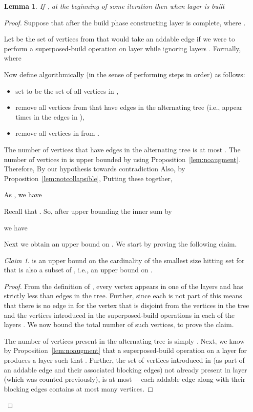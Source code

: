 \documentclass[11pt]{article}
\newtheorem{lemma}[theorem]{Lemma}
\theoremstyle{definition}
\theoremstyle{remark}
\newtheorem{claim}[theorem]{Claim}
\begin{document}
\begin{lemma}\label{lem:addable1}
  If , at the beginning of some iteration then when layer  is built

\end{lemma}
\begin{proof}
  Suppose that after the build phase constructing layer  is complete,  where . 

  Let  be the set of  vertices from  that would
  take an addable edge if we were to perform a superposed-build
  operation on layer  while ignoring layers
  . Formally,  where
  

  Now define  algorithmically (in the sense of performing steps in
  order) as follows:
  \begin{itemize}
  \item set  to be the set of all  vertices in ,
  \item remove all  vertices from  that have  edges in the alternating tree (i.e., appear  times in the edges in ),
  \item remove all  vertices in  from .
  \end{itemize}
The number of  vertices that have  edges in the alternating tree is at most . The number of  vertices in  is upper bounded by  using Proposition~\ref{lem:noaugment}. Therefore, 
By our hypothesis towards contradiction  Also, by Proposition~\ref{lem:notcollapsible},  Putting these together,


As , we have 

Recall that . So, after upper bounding the inner sum by

we have 

Next we obtain an upper bound on . We start by proving the following claim.

\begin{claim}\label{claim:local}
   is an upper bound on the cardinality of the
  smallest size hitting set for  that is also a subset of , i.e., an upper bound on .
\end{claim}
\begin{proof}
  From the definition of , every vertex  appears in one of
  the layers  and has strictly less than  edges
  in the tree. Further, since each  is not part of
   this means that there is no edge in  for
  the vertex  that is disjoint from the  vertices in the tree
  and the  vertices introduced in the superposed-build operations
  in each of the layers . We now bound the total
  number of such  vertices, to prove the claim.

The number of  vertices present in the alternating tree
 is simply . Next, we know by Proposition~\ref{lem:noaugment} that a
superposed-build operation on a layer  for 
produces a layer  such that . Further,
the set of  vertices introduced in  (as part of an addable
edge and their associated blocking edges) not already present in layer
 (which was counted previously), is at most
---each addable edge along with their blocking edges
contains at most  many  vertices.
\end{proof}


\end{proof}
\end{document}
